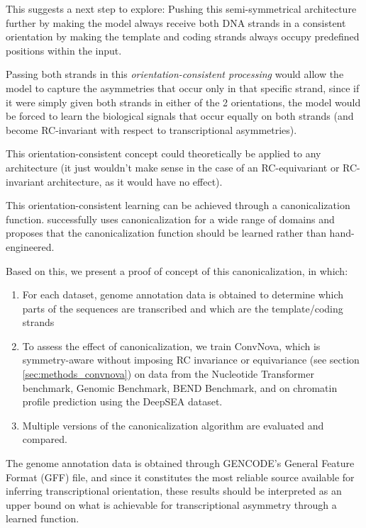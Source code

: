 \documentclass[   ]{article}
\begin{document}
This suggests a next step to explore: Pushing this semi-symmetrical architecture further by making the model always receive both DNA strands in a consistent orientation by making the template and coding strands always occupy predefined positions within the input.

Passing both strands in this \emph{orientation-consistent processing} would
allow the model to capture the asymmetries that occur only in that
specific strand, since if it were simply given both strands in either of
the 2 orientations, the model would be forced to learn the biological
signals that occur equally on both strands (and become RC-invariant with
respect to transcriptional asymmetries).

This orientation-consistent concept could theoretically be applied to any architecture (it just wouldn't make sense in the case of an RC-equivariant or RC-invariant architecture, as it would have no effect).

This orientation-consistent learning can be achieved through a canonicalization function. \citet{kabaEquivarianceLearnedCanonicalization2023} successfully
uses canonicalization for a wide range of domains and proposes that
the canonicalization function should be learned rather than hand-engineered.

Based on this, we present a proof of concept of this canonicalization, in which:
\begin{enumerate}
	\item For each dataset, genome annotation data is obtained to determine which parts of the sequences are transcribed and which are the template/coding strands
	\item To assess the effect of canonicalization, we train ConvNova, which is symmetry-aware without imposing RC invariance or equivariance (see section \ref{sec:methods_convnova}) on data from the Nucleotide Transformer benchmark\citep{dalla-torreNucleotideTransformerBuilding2025}, Genomic Benchmark\citep{gresovaGenomicBenchmarksCollection2023}, BEND Benchmark\citep{marinBENDBenchmarkingDNA2023}, and on chromatin profile prediction using the DeepSEA dataset\citep{zhouPredictingEffectsNoncoding2015}.
	\item Multiple versions of the canonicalization algorithm are evaluated and compared.
\end{enumerate}

The genome annotation data is obtained through GENCODE's General Feature Format (GFF) file, and since it constitutes the most reliable source available for
inferring transcriptional orientation, these results should be
interpreted as an upper bound on what is achievable for transcriptional
asymmetry through a learned function.
\end{document}
